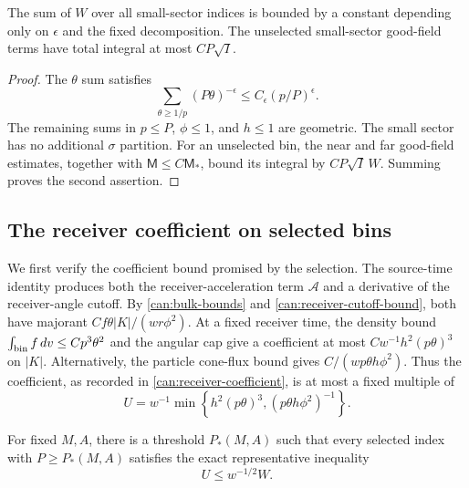 \begin{lemma}\label{sel:weight-sum}
The sum of $W$ over all small-sector indices is bounded by a constant
depending only on $\epsilon$ and the fixed decomposition. The unselected
small-sector good-field terms have total integral at most $CP\sqrt I$.
\end{lemma}

\begin{proof}
The $\theta$ sum satisfies
\[
 \sum_{\theta\ge1/p}(P\theta)^{-\epsilon}
 \le C_\epsilon(p/P)^\epsilon.
\]
The remaining sums in $p\le P$, $\phi\le1$, and $h\le1$ are geometric.
The small sector has no additional $\sigma$ partition.
For an unselected bin, the near and far good-field estimates, together
with $\mathsf M\le C\mathsf M_*$, bound its integral by
$CP\sqrt I\,W$. Summing proves the second assertion.
\end{proof}

\subsection{The receiver coefficient on selected bins}

We first verify the coefficient bound promised by the selection. The
source-time identity produces both the receiver-acceleration term
$\mathcal A$ and a derivative of the receiver-angle cutoff. By
\eqref{can:bulk-bounds} and \eqref{can:receiver-cutoff-bound}, both have
majorant
$Cf\theta|K|/(wr\phi^2)$. At a fixed receiver time, the density bound
$\int_{\rm bin}f\,dv\le Cp^3\theta^2$ and the angular cap give a
coefficient at most $Cw^{-1}h^2(p\theta)^3$ on $|K|$. Alternatively,
the particle cone-flux bound gives $C/(wp\theta h\phi^2)$. Thus the
coefficient, as recorded in \eqref{can:receiver-coefficient}, is at most a fixed multiple of
\begin{equation}\label{sel:U}
 U=w^{-1}\min\left\{h^2(p\theta)^3,
                         (p\theta h\phi^2)^{-1}\right\}.
\end{equation}

\begin{lemma}\label{sel:exponents}
For fixed $M,A$, there is a threshold $P_*(M,A)$ such that every selected
index with $P\ge P_*(M,A)$ satisfies the exact representative inequality
\begin{equation}\label{sel:safe}
 U\le w^{-1/2}W.
\end{equation}
\end{lemma}

